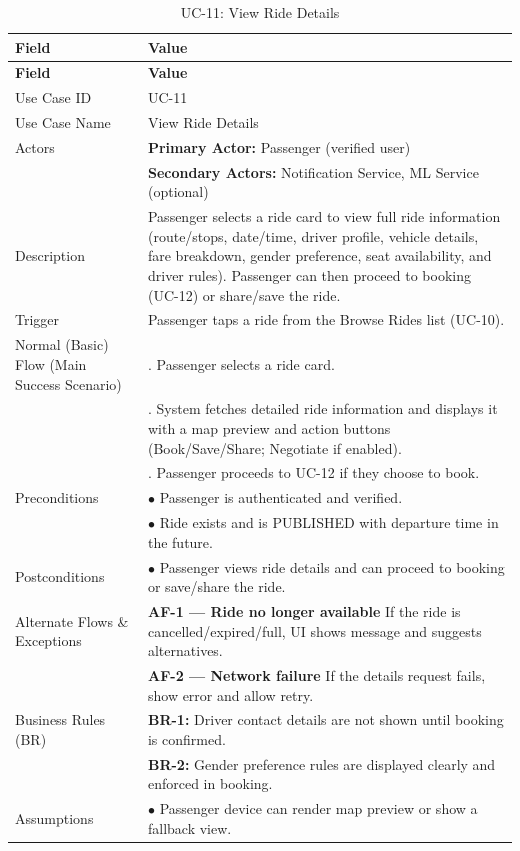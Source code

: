 \begin{longtable}{|>{\raggedright\arraybackslash}p{4cm}|>{\raggedright\arraybackslash}p{11cm}|}
\caption{UC-11: View Ride Details}
\label{tab:uc-11} \\
\hline
\rowcolor{lightgray!30}
\textbf{Field} & \textbf{Value} \\
\hline
\endfirsthead
\hline
\rowcolor{lightgray!30}
\textbf{Field} & \textbf{Value} \\
\hline
\endhead
\hline
\endfoot
\hline
\endlastfoot
Use Case ID & UC-11 \\
\hline
Use Case Name & View Ride Details \\
\hline
Actors & \textbf{Primary Actor:} Passenger (verified user) \\
& \textbf{Secondary Actors:} Notification Service, ML Service (optional) \\
\hline
Description & Passenger selects a ride card to view full ride information (route/stops, date/time, driver profile, vehicle details, fare breakdown, gender preference, seat availability, and driver rules). Passenger can then proceed to booking (UC-12) or share/save the ride. \\
\hline
Trigger & Passenger taps a ride from the Browse Rides list (UC-10). \\
\hline
Normal (Basic) Flow (Main Success Scenario) & 1. Passenger selects a ride card. \\
& 2. System fetches detailed ride information and displays it with a map preview and action buttons (Book/Save/Share; Negotiate if enabled). \\
& 3. Passenger proceeds to UC-12 if they choose to book. \\
\hline
Preconditions & $\bullet$ Passenger is authenticated and verified. \\
& $\bullet$ Ride exists and is PUBLISHED with departure time in the future. \\
\hline
Postconditions & $\bullet$ Passenger views ride details and can proceed to booking or save/share the ride. \\
\hline
Alternate Flows \& Exceptions & \textbf{AF-1 — Ride no longer available} \newline If the ride is cancelled/expired/full, UI shows message and suggests alternatives. \\
& \textbf{AF-2 — Network failure} \newline If the details request fails, show error and allow retry. \\
\hline
Business Rules (BR) & \textbf{BR-1:} Driver contact details are not shown until booking is confirmed. \\
& \textbf{BR-2:} Gender preference rules are displayed clearly and enforced in booking. \\
\hline
Assumptions & $\bullet$ Passenger device can render map preview or show a fallback view. \\
\end{longtable}

